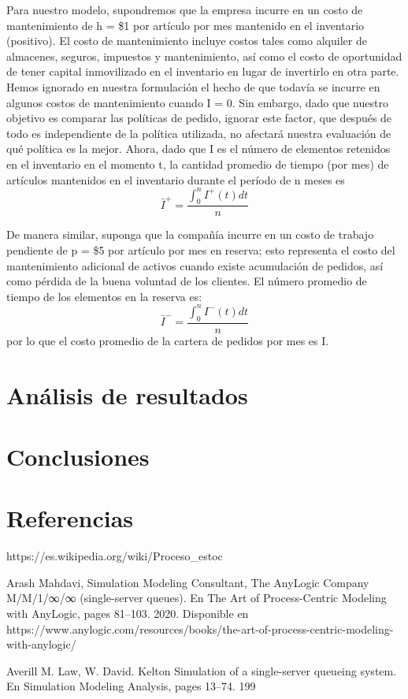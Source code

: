 Para nuestro modelo, supondremos que la empresa incurre en un costo de mantenimiento de
h = \$1 por artículo por mes mantenido en el inventario (positivo).
El costo de mantenimiento incluye costos tales como alquiler de almacenes, seguros, impuestos
y mantenimiento, así como el costo de oportunidad de tener capital inmovilizado en el inventario
en lugar de invertirlo en otra parte.
Hemos ignorado en nuestra formulación el hecho de que todavía se incurre en algunos costos de
mantenimiento cuando I = 0.
Sin embargo, dado que nuestro objetivo es comparar las políticas de pedido, ignorar este factor,
que después de todo es independiente de la política utilizada, no afectará nuestra evaluación
de qué política es la mejor.
Ahora, dado que I es el número de elementos retenidos en el inventario en el momento t,
la cantidad promedio de tiempo (por mes) de artículos mantenidos en el inventario durante el
período de n meses es
\begin{equation}
  \label{eq:equation11}
  \bar{I}^{+}=\frac{\int_{0}^{n}I^{+}(t)dt}{n}
\end{equation}

De manera similar, suponga que la compañía incurre en un costo de trabajo pendiente de p = \$5 por
artículo por mes en reserva;
esto representa el costo del mantenimiento adicional de activos cuando existe acumulación de pedidos,
así como pérdida de la buena voluntad de los clientes.
El número promedio de tiempo de los elementos en la reserva es:
\begin{equation}
    \label{eq:equation12}
    \bar{I}^{-}=\frac{\int_{0}^{n}I^{-}(t)dt}{n}
\end{equation}
por lo que el costo promedio de la cartera de pedidos por mes es \pi I.

\section{Análisis de resultados}



\section{Conclusiones}
\section{Referencias}
  \label{sec:references}
    https://es.wikipedia.org/wiki/Proceso_estoc%

    Arash Mahdavi, Simulation Modeling Consultant, The AnyLogic Company M/M/1/∞/∞ (single-server
    queues). En The Art of Process-Centric Modeling with AnyLogic, pages 81–103. 2020. Disponible en https://www.anylogic.com/resources/books/the-art-of-process-centric-modeling-with-anylogic/

    Averill M. Law, W. David. Kelton Simulation of a single-server queueing system. En Simulation Modeling Analysis,
    pages 13–74. 199
